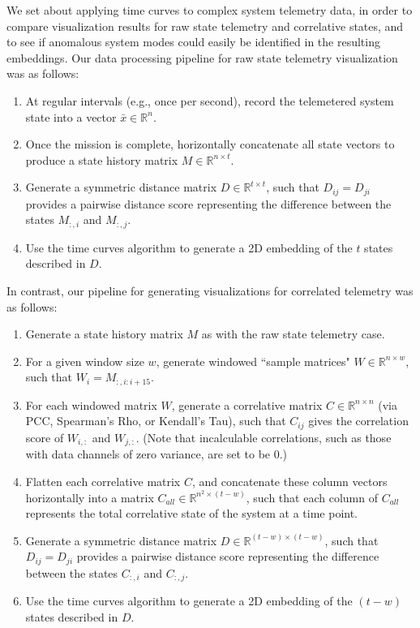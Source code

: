 We set about applying time curves to complex system telemetry data, in order to compare visualization results for raw state telemetry and correlative states, and to see if anomalous system modes could easily be identified in the resulting embeddings. Our data processing pipeline for raw state telemetry visualization was as follows:

\begin{enumerate}
    \item At regular intervals (e.g., once per second), record the telemetered system state into a vector $\bar{x} \in \mathbb{R}^{n}$.
    \item Once the mission is complete, horizontally concatenate all state vectors to produce a state history matrix $M \in \mathbb{R}^{n \times t}$.
    \item Generate a symmetric distance matrix $D \in \mathbb{R}^{t \times t}$, such that $D_{ij} = D_{ji}$ provides a pairwise distance score representing the difference between the states $M_{:,i}$ and $M_{:,j}$.
    \item Use the time curves algorithm to generate a 2D embedding of the $t$ states described in $D$.
\end{enumerate}

In contrast, our pipeline for generating visualizations for correlated telemetry was as follows:

\begin{enumerate}
    \item Generate a state history matrix $M$ as with the raw state telemetry case.
    \item For a given window size $w$, generate windowed ``sample matrices" $W \in \mathbb{R}^{n \times w}$, such that $W_{i} = M_{:, i:i+15}$.
    \item For each windowed matrix $W$, generate a correlative matrix $C \in \mathbb{R}^{n \times n}$ (via PCC, Spearman's Rho, or Kendall's Tau), such that $C_{ij}$ gives the correlation score of $W_{i,:}$ and $W_{j,:}$. (Note that incalculable correlations, such as those with data channels of zero variance, are set to be 0.)
    \item Flatten each correlative matrix $C$, and concatenate these column vectors horizontally into a matrix $C_{all} \in \mathbb{R}^{n^{2} \times (t - w)}$, such that each column of $C_{all}$ represents the total correlative state of the system at a time point.
    \item Generate a symmetric distance matrix $D \in \mathbb{R}^{(t - w) \times (t - w)}$, such that $D_{ij} = D_{ji}$ provides a pairwise distance score representing the difference between the states $C_{:,i}$ and $C_{:,j}$.
    \item Use the time curves algorithm to generate a 2D embedding of the $(t - w)$ states described in $D$.
\end{enumerate}

